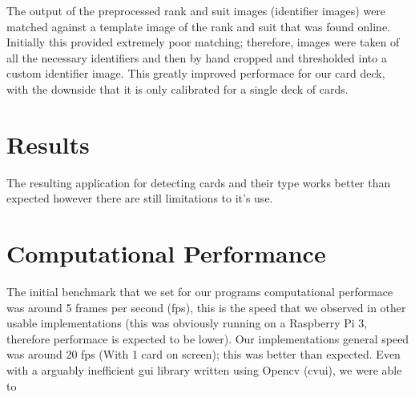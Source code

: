 \documentclass[conference]{IEEEtran}
\begin{document}

The output of the preprocessed rank and suit images (identifier images) were matched against a
template image of the rank and suit that was found online. Initially this provided extremely poor
matching; therefore, images were taken of all the necessary identifiers and then by hand cropped and
thresholded into a custom identifier image. This greatly improved performace for our card deck, with
the downside that it is only calibrated for a single deck of cards.


\section{Results}
The resulting application for detecting cards and their type works better than expected however
there are still limitations to it's use.

\section{Computational Performance}
The initial benchmark that we set for our programs computational performace was around 5 frames per
second (fps), this is the speed that we observed in other usable implementations
\cite{opencv-card-detection} (this was obviously running on a Raspberry Pi 3, therefore performace
is expected to be lower). Our implementations general speed was around 20 fps (With 1 card on
screen); this was better than expected. Even with a arguably inefficient gui library written using
Opencv (cvui), we were able to 
\end{document}
